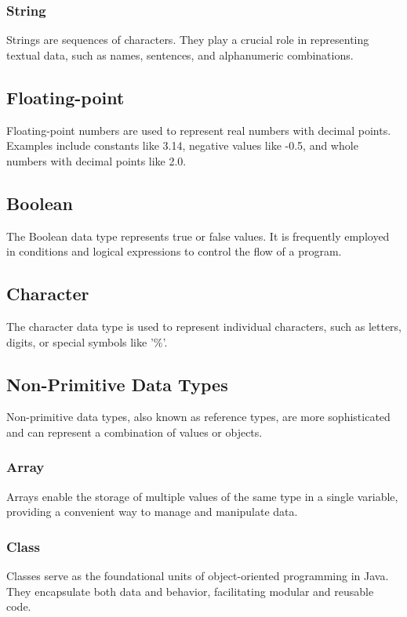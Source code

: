 \documentclass{article}
\begin{document}
\subsubsection{String}
Strings are sequences of characters. They play a crucial role in representing textual data, such as names, sentences, and alphanumeric combinations.

\subsection{Floating-point}
Floating-point numbers are used to represent real numbers with decimal points. Examples include constants like 3.14, negative values like -0.5, and whole numbers with decimal points like 2.0.

\subsection{Boolean}
The Boolean data type represents true or false values. It is frequently employed in conditions and logical expressions to control the flow of a program.

\subsection{Character}
The character data type is used to represent individual characters, such as letters, digits, or special symbols like '$\%$'.

\subsection{Non-Primitive Data Types}
Non-primitive data types, also known as reference types, are more sophisticated and can represent a combination of values or objects.

\subsubsection{Array}
Arrays enable the storage of multiple values of the same type in a single variable, providing a convenient way to manage and manipulate data.

\subsubsection{Class}
Classes serve as the foundational units of object-oriented programming in Java. They encapsulate both data and behavior, facilitating modular and reusable code.
\end{document}
